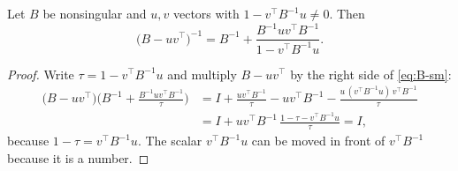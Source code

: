 \begin{lemma}\label{lem:B-sm}
Let $B$ be nonsingular and $u, v$ vectors with $1 - v^\top B^{-1}u \neq 0$. Then
\begin{equation}\label{eq:B-sm}
\big(B - uv^\top\big)^{-1} = B^{-1} + \frac{B^{-1}uv^\top B^{-1}}{1 - v^\top B^{-1}u} .
\end{equation}
\end{lemma}

\begin{proof}
Write $\tau = 1 - v^\top B^{-1}u$ and multiply $B - uv^\top$ by the right side of \eqref{eq:B-sm}:
\begin{align*}
\big(B - uv^\top\big)\Big(B^{-1} + \frac{B^{-1}uv^\top B^{-1}}{\tau}\Big)
&= I + \frac{uv^\top B^{-1}}{\tau} - uv^\top B^{-1} - \frac{u\,(v^\top B^{-1}u)\,v^\top B^{-1}}{\tau} \\
&= I + uv^\top B^{-1}\,\frac{1 - \tau - v^\top B^{-1}u}{\tau} = I ,
\end{align*}
because $1 - \tau = v^\top B^{-1}u$. The scalar $v^\top B^{-1}u$ can be moved in front of $v^\top B^{-1}$ because it
is a number.
\end{proof}

